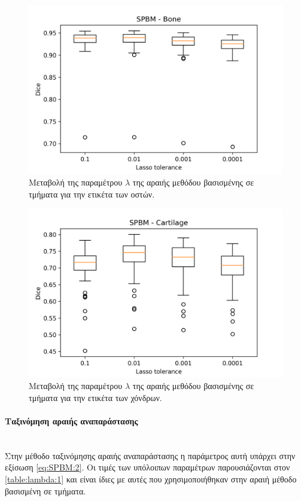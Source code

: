 \documentclass[a4paper,12pt]{article}
\newcommand{\paragraphLine}[1]{\paragraph{#1}\mbox{}\\}
\begin{document}
\begin{figure}[H]
    \centering
    \includegraphics[width=0.85\linewidth]{SPBM_Lasso_tolerance_Bone_plot.png}
    \caption{Μεταβολή της παραμέτρου $\lambda$ της αραιής μεθόδου βασισμένης σε
             τμήματα για την ετικέτα των οστών.}
    \label{fig:SPBM:lambda:2}
\end{figure}

\begin{figure}[H]
    \centering
    \includegraphics[width=0.85\linewidth]{SPBM_Lasso_tolerance_Cartilage_plot.png}
    \caption{Μεταβολή της παραμέτρου $\lambda$ της αραιής μεθόδου βασισμένης σε
             τμήματα για την ετικέτα των χόνδρων.}
    \label{fig:SPBM:lambda:3}
\end{figure}

\paragraphLine{Ταξινόμηση αραιής αναπαράστασης}

Στην μέθοδο ταξινόμησης αραιής αναπαράστασης η παράμετρος αυτή υπάρχει στην
εξίσωση \eqref{eq:SPBM:2}. Οι τιμές των υπόλοιπων παραμέτρων παρουσιάζονται στον
\autoref{table:lambda:1} και είναι ίδιες με αυτές που χρησιμοποιήθηκαν στην
αραιή μέθοδο βασισμένη σε τμήματα.
\end{document}
